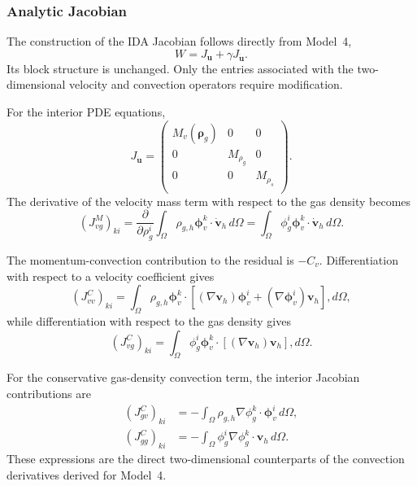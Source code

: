 \subsubsection{Analytic Jacobian}

The construction of the IDA Jacobian follows directly from Model~4,
\begin{equation}
W=J_{\mathbf u}+\gamma J_{\dot{\mathbf u}}.
\end{equation}
Its block structure is unchanged. Only the entries associated with the two-dimensional velocity and convection operators require modification.

For the interior PDE equations,
\begin{equation}
J_{\dot{\mathbf u}}=
\begin{pmatrix}
M_v(\boldsymbol\rho_g)&0&0\\
0&M_{\rho_g}&0\\
0&0&M_{\rho_s}\\
\end{pmatrix}.
\end{equation}
The derivative of the velocity mass term with respect to the gas density becomes
\begin{equation}\label{eq:model5_JvgM}
(J_{vg}^{M})_{ki}
=\frac{\partial}{\partial\rho_g^i}
\int_\Omega\rho_{g,h}\boldsymbol\phi_v^k\cdot\dot{\mathbf v}_h\,d\Omega
=\int_\Omega\phi_g^i\boldsymbol\phi_v^k\cdot\dot{\mathbf v}_h\,d\Omega.
\end{equation}

The momentum-convection contribution to the residual is $-C_v$. Differentiation with respect to a velocity coefficient gives
\begin{equation}\label{eq:model5_JvvC}
(J_{vv}^{C})_{ki}=\int_\Omega\rho_{g,h}\boldsymbol\phi_v^k\cdot
\left[
(\nabla\mathbf v_h)\boldsymbol\phi_v^i
+(\nabla\boldsymbol\phi_v^i)\mathbf v_h
\right],d\Omega,
\end{equation}
while differentiation with respect to the gas density gives
\begin{equation}\label{eq:model5_JvgC}
(J_{vg}^{C})_{ki}
=\int_\Omega\phi_g^i\boldsymbol\phi_v^k\cdot
\left[(\nabla\mathbf v_h)\mathbf v_h\right],d\Omega.
\end{equation}

For the conservative gas-density convection term, the interior Jacobian contributions are
\begin{align}
(J_{gv}^{C})_{ki}
&=-\int_\Omega\rho_{g,h}\nabla\phi_g^k\cdot\boldsymbol\phi_v^i\,d\Omega,\\
(J_{gg}^{C})_{ki}
&=-\int_\Omega\phi_g^i\nabla\phi_g^k\cdot\mathbf v_h\,d\Omega.
\end{align}
These expressions are the direct two-dimensional counterparts of the convection derivatives derived for Model~4.

